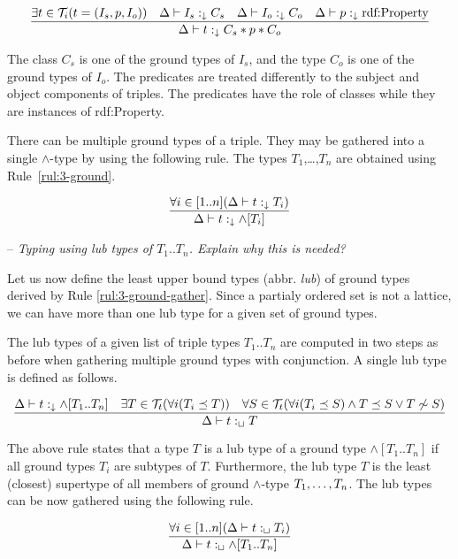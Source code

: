 \documentclass[runningheads]{llncs}
\newcommand{\darr}{\downarrow}
\newcommand{\T}{{\cal T}}
\newcommand{\Tt}{{\cal T}_t}
\newcommand{\notes}[1]{\noindent\begin{small}-- \emph{#1}\\\end{small}}
\begin{document}
\begin{equation}
\label{rul:3-ground}
\dfrac{\exists\/t\in\/\T_i(t=(I_s,p,I_o))\quad \Delta\vdash\/I_s:_\darr\/C_s\quad \Delta\vdash\/I_o:_\darr\/C_o\quad \Delta\vdash\/p:_\darr\text{rdf:Property}}
      {\Delta\vdash\/t:_\darr\/C_s*p*C_o}
\end{equation}

The class $C_s$ is one of the ground types of $I_s$, and the type $C_o$
is one of the ground types of $I_o$. The predicates are treated
differently to the subject and object components of triples. The
predicates have the role of classes while they are instances of
rdf:Property.

There can be multiple ground types of a triple. They may be gathered
into a single $\land$-type by using the following rule. The types
$T_1$,\ldots,$T_n$ are obtained using Rule~\ref{rul:3-ground}.

\begin{equation}
\label{rul:3-ground-gather}
\dfrac{\forall\/i\in[1..n](\Delta\vdash\/t:_\darr\/T_i)}
      {\Delta\vdash\/t:_\darr\land[T_i]}
\end{equation}


\notes{Typing using lub types of $T_1..T_n$. Explain why this is needed?}

Let us now define the least upper bound types (abbr. \emph{lub}) of
ground types derived by Rule \ref{rul:3-ground-gather}. Since a
partialy ordered set is not a lattice, we can have more than one lub
type for a given set of ground types.

The lub types of a given list of triple types $T_1..T_n$ are
computed in two steps as before when gathering multiple ground types
with conjunction. A single lub type is defined as follows.

\begin{equation}
\dfrac{\Delta\vdash\/t:_\darr\land[T_1..T_n]\quad \exists\/T\in\Tt(\forall\/i(T_i\preceq\/T))\quad \forall\/S\in\T_t(\forall\/i(T_i\preceq\/S)\land\/T\preceq\/S\lor\/T\not\sim\/S)}
      {\Delta\vdash\/t:_\sqcup\/T}
\end{equation}

The above rule states that a type $T$ is a lub type of a ground type 
$\land[T_1..T_n]$ if all ground types $T_i$ are subtypes of
$T$. Furthermore, the lub type $T$ is the least (closest) supertype of
all members of ground $\land$-type $T_1,\ldots\/,T_n$. The lub types
can be now gathered using the following rule.

\begin{equation}
\dfrac{\forall i\in[1..n](\Delta\vdash\/t:_\sqcup\/T_i)}
      {\Delta\vdash\/t:_\sqcup\land[T_1..T_n]}
\end{equation}
\end{document}
